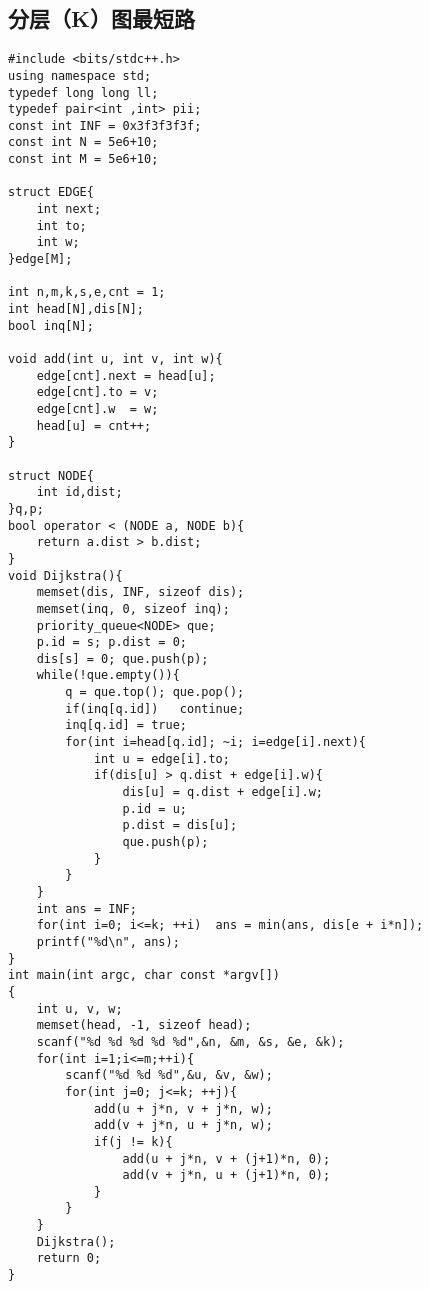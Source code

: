 \documentclass[twocolumn,a4]{article}
\begin{document}
\subsection{分层（K）图最短路}
\begin{lstlisting}
#include <bits/stdc++.h>
using namespace std;
typedef long long ll;
typedef pair<int ,int> pii;
const int INF = 0x3f3f3f3f;
const int N = 5e6+10;
const int M = 5e6+10;
  
struct EDGE{
    int next;
    int to;
    int w;
}edge[M];
  
int n,m,k,s,e,cnt = 1;
int head[N],dis[N];
bool inq[N];
  
void add(int u, int v, int w){
    edge[cnt].next = head[u];
    edge[cnt].to = v;
    edge[cnt].w  = w;
    head[u] = cnt++;
}
  
struct NODE{
    int id,dist;
}q,p;
bool operator < (NODE a, NODE b){
    return a.dist > b.dist;
}
void Dijkstra(){
    memset(dis, INF, sizeof dis);
    memset(inq, 0, sizeof inq);
    priority_queue<NODE> que;
    p.id = s; p.dist = 0;
    dis[s] = 0; que.push(p);
    while(!que.empty()){
        q = que.top(); que.pop();
        if(inq[q.id])   continue;
        inq[q.id] = true;
        for(int i=head[q.id]; ~i; i=edge[i].next){
            int u = edge[i].to;
            if(dis[u] > q.dist + edge[i].w){
                dis[u] = q.dist + edge[i].w;
                p.id = u;
                p.dist = dis[u];
                que.push(p);
            }
        }
    }
    int ans = INF;
    for(int i=0; i<=k; ++i)  ans = min(ans, dis[e + i*n]);
    printf("%d\n", ans);
}
int main(int argc, char const *argv[])
{
    int u, v, w;
    memset(head, -1, sizeof head);
    scanf("%d %d %d %d %d",&n, &m, &s, &e, &k);
    for(int i=1;i<=m;++i){
        scanf("%d %d %d",&u, &v, &w);
        for(int j=0; j<=k; ++j){
            add(u + j*n, v + j*n, w);
            add(v + j*n, u + j*n, w);
            if(j != k){
                add(u + j*n, v + (j+1)*n, 0);
                add(v + j*n, u + (j+1)*n, 0);
            }
        }
    }
    Dijkstra();
    return 0;
}
\end{lstlisting}
\end{document}
